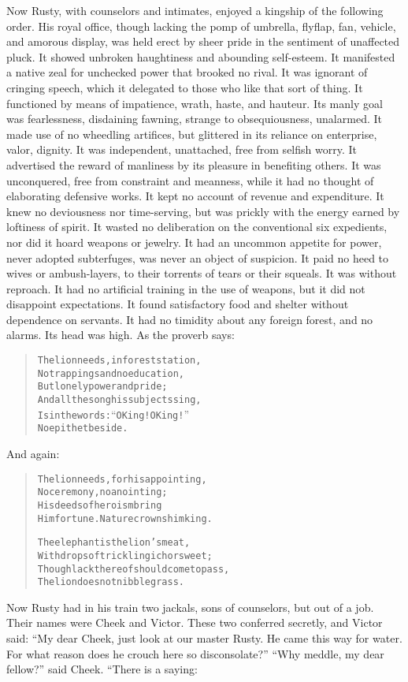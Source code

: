 \documentclass[article, twoside, 14pt]{memoir}
\renewenvironment{verbatim}{%
\begin{quote}%
\vskip -10pt%
\begin{alltt}\normalfont\large}{\end{alltt}%
\end{quote}%
\vskip -10pt
} %
\begin{document}
Now Rusty, with counselors and intimates, enjoyed a kingship of the
following order. His royal office, though lacking the pomp of
umbrella, flyflap, fan, vehicle, and amorous display, was held
erect by sheer pride in the sentiment of unaffected pluck. It
showed unbroken haughtiness and abounding self-esteem. It
manifested a native zeal for unchecked power that brooked no rival.
It was ignorant of cringing speech, which it delegated to those who
like that sort of thing. It functioned by means of impatience,
wrath, haste, and hauteur. Its manly goal was fearlessness,
disdaining fawning, strange to obsequiousness, unalarmed. It made
use of no wheedling artifices, but glittered in its reliance on
enterprise, valor, dignity. It was independent, unattached, free
from selfish worry. It advertised the reward of manliness by its
pleasure in benefiting others. It was unconquered, free from
constraint and meanness, while it had no thought of elaborating
defensive works. It kept no account of revenue and expenditure. It
knew no deviousness nor time-serving, but was prickly with the
energy earned by loftiness of spirit. It wasted no deliberation on
the conventional six expedients, nor did it hoard weapons or
jewelry. It had an uncommon appetite for power, never adopted
subterfuges, was never an object of suspicion. It paid no heed to
wives or ambush-layers, to their torrents of tears or their
squeals. It was without reproach. It had no artificial training in
the use of weapons, but it did not disappoint expectations. It
found satisfactory food and shelter without dependence on servants.
It had no timidity about any foreign forest, and no alarms.
Its head was high. As the proverb says:

\begin{verbatim}
The lion needs, in forest station,
No trappings and no education,
    But lonely power and pride;
And all the song his subjects sing,
Is in the words: “O King! O King!”
    No epithet beside.
\end{verbatim}
And again:

\begin{verbatim}
The lion needs, for his appointing,
No ceremony, no anointing;
His deeds of heroism bring
Him fortune. Nature crowns him king.

The elephant is the lion's meat,
With drops of trickling ichor sweet;
Though lack thereof should come to pass,
The lion does not nibble grass.
\end{verbatim}
Now Rusty had in his train two jackals, sons of counselors, but out
of a job. Their names were Cheek and Victor. These two conferred
secretly, and Victor said:
``My dear Cheek, just look at our master Rusty. He came this way for water. For what reason does he crouch here so disconsolate?''
``Why meddle, my dear fellow?'' said Cheek. “There is a saying:
\end{document}
